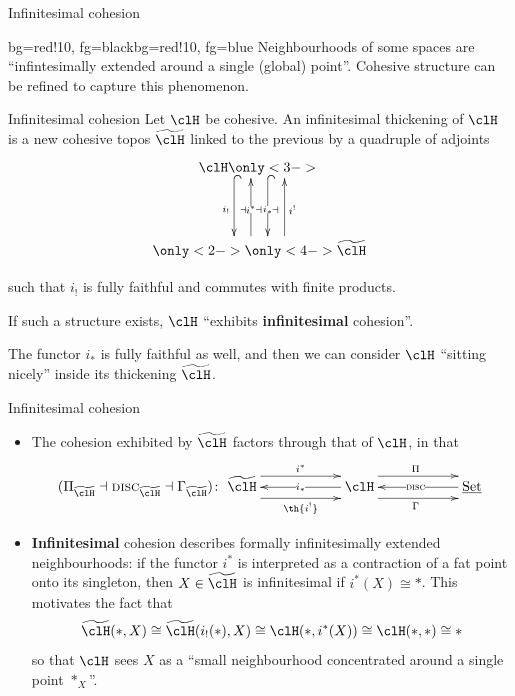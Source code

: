\documentclass[presentation]{beamer}
\begin{document}
%
%
%
%
%
%
%
\begin{frame}{Infinitesimal cohesion}
	\begin{variableblock}{}{bg=red!10, fg=black}{bg=red!10, fg=blue}
		Neighbourhoods of some spaces are ``infintesimally extended around a single (global) point''. Cohesive structure can be refined to capture this phenomenon.
	\end{variableblock}
\end{frame}
%
%
%
%
%
%
%
\begin{frame}{Infinitesimal cohesion}
	Let $\clH$ be cohesive. An \alert{infinitesimal thickening} of $\clH$ is a new cohesive topos $\thH$ linked to the previous by a quadruple of adjoints
	\[
		\xymatrix@R=1.5cm{
		\clH
		\ar@{^{(}->}@<-18pt>[d]_{i_!}
		\only<3->{\ar@{^{(}->}@<6pt>[d]|{i_*}^\dashv}
		\\
		\ar@[white]@<-18pt>[u]_{\color{white}i^!}
		\only<2->{\ar@<6pt>[u]|{i^*}_\dashv^\dashv}
		\only<4->{\ar@<-18pt>[u]_{i^!}}
		\thH
		}
	\]

	\vspace*{\fill}
	such that $i_!$ is fully faithful and commutes with finite products.

	If such a structure exists, $\clH$ ``exhibits \textbf{infinitesimal} cohesion''.
	\onslide<6->
	\begin{myblock}{}
		The functor $i_*$ is fully faithful as well, and then we can consider $\clH$ ``sitting nicely'' inside its thickening $\thH$.
	\end{myblock}
\end{frame}
%
%
%
%
%
%
%
\begin{frame}{Infinitesimal cohesion}
	\begin{itemize}
		\item<+-> The cohesion exhibited by $\thH$ \alert{factors through} that of $\clH$, in that
		      \[
			      (\Pi_{\thH} \dashv \disc_{\thH} \dashv \Gamma_{\thH})
			      \colon
			      \xymatrix@C=2cm{
			      \thH \ar@<-8pt>[r]_{\th{i^!}} \ar@{<-}[r]|{i_*} \ar@<8pt>[r]^{i^*} &
			      \clH \ar@<-8pt>[r]_\Gamma \ar@{<-}[r]|{\disc} \ar@<8pt>[r]^\Pi &
			      \Set
			      }
		      \]
		\item<+-> \textbf{Infinitesimal} cohesion describes formally infinitesimally extended neighbourhoods: if the functor $i^*$ is interpreted as a \alert{contraction} of a fat point onto its singleton, then $X\in \thH$ is infinitesimal if $i^*(X)\cong *$. \onslide<+->This motivates the fact that
		      \[
			      \thH(*,X)\cong \thH(i_!(*),X)\cong \clH(*,i^*(X))\cong \clH(*,*)\cong *
		      \]
		      so that $\clH$ sees $X$ as a  ``small neighbourhood concentrated around a single point $*_X$''.
	\end{itemize}
\end{frame}
\end{document}
